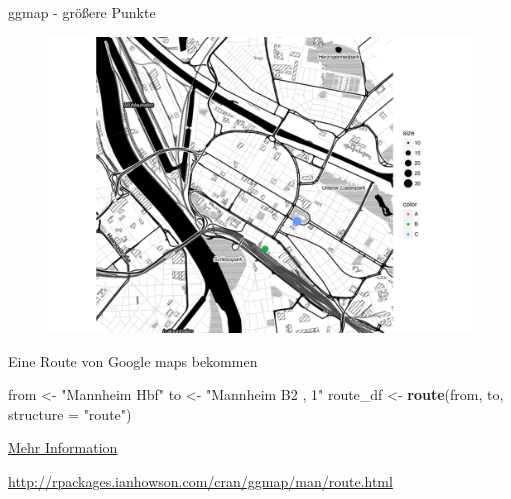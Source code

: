 \documentclass[ignorenonframetext,]{beamer}
\newenvironment{Shaded}{}{}
\newcommand{\KeywordTok}[1]{\textcolor[rgb]{0.00,0.44,0.13}{\textbf{{#1}}}}
\newcommand{\DataTypeTok}[1]{\textcolor[rgb]{0.56,0.13,0.00}{{#1}}}
\newcommand{\DecValTok}[1]{\textcolor[rgb]{0.25,0.63,0.44}{{#1}}}
\newcommand{\StringTok}[1]{\textcolor[rgb]{0.25,0.44,0.63}{{#1}}}
\newcommand{\NormalTok}[1]{{#1}}
\begin{document}
\begin{frame}[fragile]{ggmap - größere Punkte}

\begin{Shaded}
\end{Shaded}

\begin{figure}[htbp]
\centering
\includegraphics{RSocialScience2_files/figure-beamer/unnamed-chunk-58-1.pdf}
\caption{}
\end{figure}

\end{frame}

\begin{frame}[fragile]{Eine Route von Google maps bekommen}

\begin{Shaded}
\begin{Highlighting}[]
\NormalTok{from <-}\StringTok{ "Mannheim Hbf"}
\NormalTok{to <-}\StringTok{ "Mannheim B2 , 1"}
\NormalTok{route_df <-}\StringTok{ }\KeywordTok{route}\NormalTok{(from, to, }\DataTypeTok{structure =} \StringTok{"route"}\NormalTok{)}
\end{Highlighting}
\end{Shaded}

\href{http://rpackages.ianhowson.com/cran/ggmap/man/route.html}{Mehr
Information}

\url{http://rpackages.ianhowson.com/cran/ggmap/man/route.html}

\end{frame}
\end{document}
